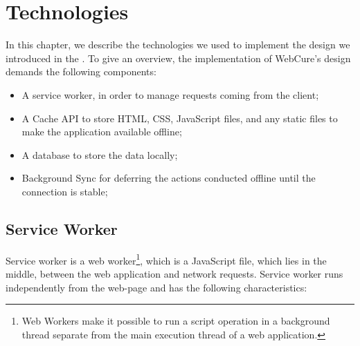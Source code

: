 \chapter{Technologies}
\label{Technologies}

In this chapter, we describe the technologies we used to implement the design we introduced in the . To give an overview, the implementation of WebCure's design demands the following components:

\begin{itemize}
\item{A service worker, in order to manage requests coming from the client;}
\item{A Cache API to store HTML, CSS, JavaScript files, and any static files\cite{41} to make the application available offline;}
\item{A database to store the data locally;}
\item{Background Sync for deferring the actions conducted offline until the connection is stable;}

\end{itemize}


\section{Service Worker}

Service worker\cite{1} is a web worker\footnote{Web Workers make it possible to run a script operation in a background thread separate from the main execution thread of a web application\cite{30}.}, which is a JavaScript file, which lies in the middle, between the web application and network requests. Service worker runs independently from the web-page and has the following characteristics: 

